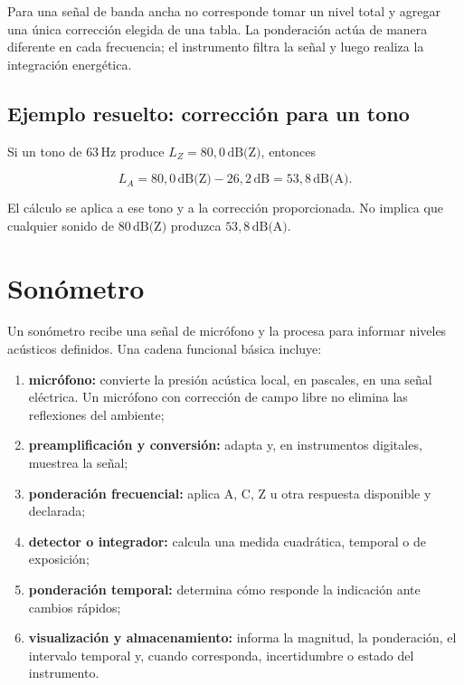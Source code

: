
Para una señal de banda ancha no corresponde tomar un nivel total y agregar
una única corrección elegida de una tabla. La ponderación actúa de manera
diferente en cada frecuencia; el instrumento filtra la señal y luego realiza
la integración energética.

\subsection{Ejemplo resuelto: corrección para un tono}
\label{sec:u5-ejemplo-ponderacion}

 Si un tono de
\(63\,\text{Hz}\) produce \(L_Z=80{,}0\,\text{dB(Z)}\), entonces

\[
    L_A=80{,}0\,\text{dB(Z)}-26{,}2\,\text{dB}
       =53{,}8\,\text{dB(A)}.
\]

El cálculo se aplica a ese tono y a la corrección proporcionada. No implica
que cualquier sonido de \(80\,\text{dB(Z)}\) produzca
\(53{,}8\,\text{dB(A)}\).


\section{Sonómetro}
\label{sec:u5-sonometro}

Un sonómetro recibe una señal de micrófono y la procesa para informar niveles
acústicos definidos. Una cadena funcional básica incluye:

\begin{enumerate}
    \item \textbf{micrófono:} convierte la presión acústica local, en
    pascales, en una señal eléctrica. Un micrófono con corrección de campo
    libre no elimina las reflexiones del ambiente;
    \item \textbf{preamplificación y conversión:} adapta y, en instrumentos
    digitales, muestrea la señal;
    \item \textbf{ponderación frecuencial:} aplica A, C, Z u otra respuesta
    disponible y declarada;
    \item \textbf{detector o integrador:} calcula una medida cuadrática,
    temporal o de exposición;
    \item \textbf{ponderación temporal:} determina cómo responde la indicación
    ante cambios rápidos;
    \item \textbf{visualización y almacenamiento:} informa la magnitud, la
    ponderación, el intervalo temporal y, cuando corresponda, incertidumbre o
    estado del instrumento.
\end{enumerate}

